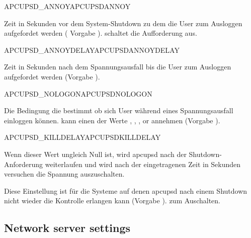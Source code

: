 \begin {description}
 {APCUPSD\_ANNOY}{APCUPSDANNOY}
  
  Zeit in Sekunden vor dem System-Shutdown zu dem die  User zum Ausloggen 
  aufgefordet werden ( Vorgabe ). 
   schaltet die Aufforderung aus. 


 {APCUPSD\_ANNOYDELAY}{APCUPSDANNOYDELAY}
 
  Zeit in Sekunden nach dem Spannungsausfall bis die User zum Ausloggen 
  aufgefordet werden (Vorgabe ).


 {APCUPSD\_NOLOGON}{APCUPSDNOLOGON}
 
  Die Bedingung die bestimmt ob sich User während eines Spannungsausfall einloggen
  können.
   kann einen der Werte 
  , , ,  or
   annehmen (Vorgabe ).


 {APCUPSD\_KILLDELAY}{APCUPSDKILLDELAY}
 
  Wenn dieser Wert ungleich Null ist, wird apcupsd nach der Shutdown-Anforderung 
  weiterlaufen und wird nach der eingetragenen Zeit in Sekunden versuchen die
  Spannung auszuschalten.
  
  Diese Einstellung ist für die Systeme auf denen apcupsd nach einem Shutdown
  nicht wieder die Kontrolle erlangen kann
  (Vorgabe ).
   zum Auschalten.

\end {description}

\subsection{Network server settings}

